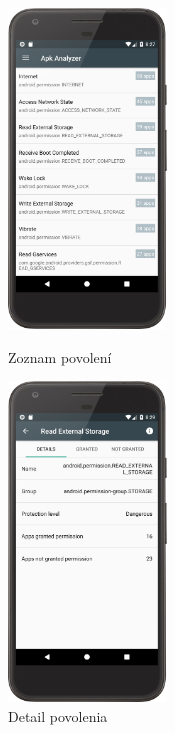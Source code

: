 \begin{figure}[H]
\begin{minipage}[t][][b]{0.5\textwidth}
\centering
    \includegraphics[width=4.2cm]{images/app/list_permissions_device.png}
\centering
\caption{Zoznam povolení}
\label{fig:permission-list}
\end{minipage}%
\hfill
\centering
\begin{minipage}[t][][b]{0.5\textwidth}
\centering
    \includegraphics[width=4.2cm]{images/app/permission_detail_device.png}
\centering
\caption{Detail povolenia}
\label{fig:permission-detail}
\end{minipage}%
\end{figure}


